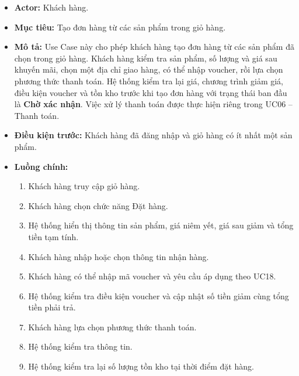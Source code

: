 \documentclass[12pt,a4paper]{article}
\begin{document}
\begin{itemize}

 \item \textbf{Actor:} Khách hàng.

 \item \textbf{Mục tiêu:} Tạo đơn hàng từ các sản phẩm trong giỏ hàng.

  \item \textbf{Mô tả:} Use Case này cho phép khách hàng tạo đơn hàng từ các sản phẩm đã chọn trong giỏ hàng. Khách hàng kiểm tra sản phẩm, số lượng và giá sau khuyến mãi, chọn một địa chỉ giao hàng, có thể nhập voucher, rồi lựa chọn phương thức thanh toán. Hệ thống kiểm tra lại giá, chương trình giảm giá, điều kiện voucher và tồn kho trước khi tạo đơn hàng với trạng thái ban đầu là \textbf{Chờ xác nhận}. Việc xử lý thanh toán được thực hiện riêng trong UC06 -- Thanh toán.

 \item \textbf{Điều kiện trước:} Khách hàng đã đăng nhập và giỏ hàng có ít nhất một sản phẩm.

 \item \textbf{Luồng chính:}

 \begin{enumerate}

  \item Khách hàng truy cập giỏ hàng.

  \item Khách hàng chọn chức năng Đặt hàng.

   \item Hệ thống hiển thị thông tin sản phẩm, giá niêm yết, giá sau giảm và tổng tiền tạm tính.

  \item Khách hàng nhập hoặc chọn thông tin nhận hàng.

   \item Khách hàng có thể nhập mã voucher và yêu cầu áp dụng theo UC18.

   \item Hệ thống kiểm tra điều kiện voucher và cập nhật số tiền giảm cùng tổng tiền phải trả.

   \item Khách hàng lựa chọn phương thức thanh toán.

  \item Hệ thống kiểm tra thông tin.

  \item Hệ thống kiểm tra lại số lượng tồn kho tại thời điểm đặt hàng.


\end{enumerate}
\end{itemize}
\end{document}
